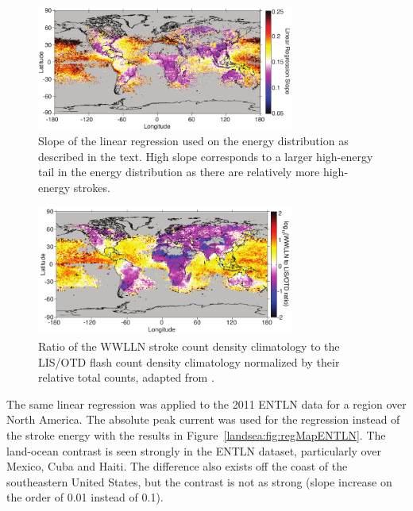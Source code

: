 \begin{figure}[ht!]
   \centering
   \noindent\includegraphics[width=20pc]{LandSea/Figures/2_regMap.pdf} 
   \caption{Slope of the linear regression used on the energy distribution as described in the text. High slope corresponds to a larger high-energy tail in the energy distribution as there are relatively more high-energy strokes.}
   \label{landsea:fig:regMap}
\end{figure}

\begin{figure}[ht!]
   \centering
   \noindent\includegraphics[width=20pc]{LandSea/Figures/3_lisMap.pdf} 
   \caption{Ratio of the WWLLN stroke count density climatology to the LIS/OTD flash count density climatology normalized by their relative total counts, adapted from \citet{Virts2013}.}
   \label{landsea:fig:virts}
\end{figure}

The same linear regression was applied to the 2011 ENTLN data for a region over North America.
The absolute peak current was used for the regression instead of the stroke energy with the results in Figure~\ref{landsea:fig:regMapENTLN}.
The land-ocean contrast is seen strongly in the ENTLN dataset, particularly over Mexico, Cuba and Haiti.
The difference also exists off the coast of the southeastern United States, but the contrast is not as strong (slope increase on the order of 0.01 instead of 0.1).

